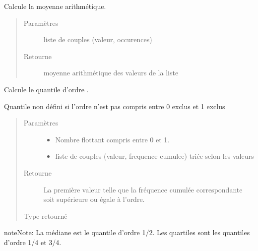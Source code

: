\documentclass[letterpaper,10pt,openany,oneside,french]{sphinxmanual}
\begin{document}
\begin{fulllineitems}
\label{\detokenize{addQuantitativesDiscretes:add.addQuantitativesDiscretes.moyenne}}
Calcule la moyenne arithmétique.
\begin{quote}\begin{description}
\item[{Paramètres}] \leavevmode
{} \textendash{} liste de couples (valeur, occurences)

\item[{Retourne}] \leavevmode
moyenne arithmétique des valeurs de la liste

\end{description}\end{quote}

\end{fulllineitems}


\begin{fulllineitems}
\label{\detokenize{addQuantitativesDiscretes:add.addQuantitativesDiscretes.quantileDiscret}}
Calcule le quantile d’ordre .

Quantile non défini si l’ordre n’est pas compris entre 0 exclus et 1 exclus
\begin{quote}\begin{description}
\item[{Paramètres}] \leavevmode\begin{itemize}
\item {} 
 \textendash{} Nombre flottant compris entre 0 et 1.

\item {} 
 \textendash{} liste de couples (valeur, frequence cumulee) triée selon les valeurs

\end{itemize}

\item[{Retourne}] \leavevmode
La première valeur telle que la fréquence cumulée correspondante soit supérieure ou égale à l’ordre.

\item[{Type retourné}] \leavevmode
{}

\end{description}\end{quote}

\begin{sphinxadmonition}{note}{Note:}
La médiane est le quantile d’ordre 1/2. Les quartiles sont les quantiles d’ordre 1/4 et 3/4.
\end{sphinxadmonition}

\end{fulllineitems}
\end{document}
